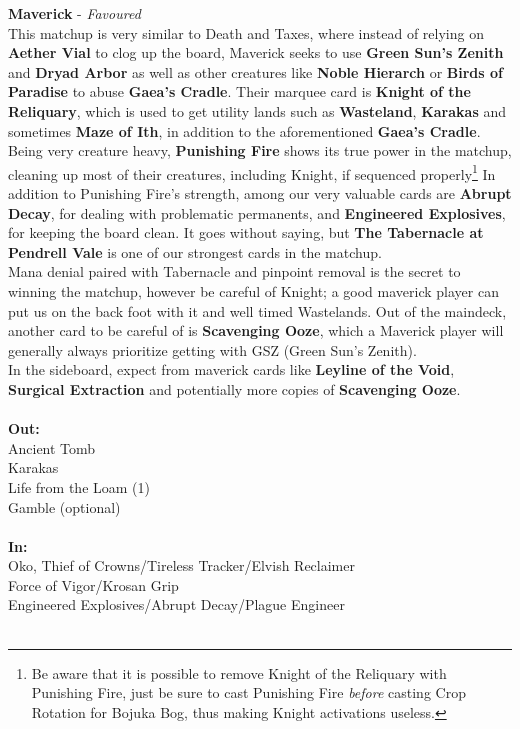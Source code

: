\documentclass{report}
\begin{document}
\textbf{Maverick} - \emph{Favoured}\\
This matchup is very similar to Death and Taxes, where instead of relying on \textbf{Aether Vial} to clog up the board, Maverick seeks to use \textbf{Green Sun's Zenith} and \textbf{Dryad Arbor} as well as other creatures like \textbf{Noble Hierarch} or \textbf{Birds of Paradise} to abuse \textbf{Gaea's Cradle}. Their marquee card is \textbf{Knight of the Reliquary}, which is used to get utility lands such as \textbf{Wasteland}, \textbf{Karakas} and sometimes \textbf{Maze of Ith}, in addition to the aforementioned \textbf{Gaea's Cradle}. Being very creature heavy, \textbf{Punishing Fire} shows its true power in the matchup, cleaning up most of their creatures, including Knight, if sequenced properly\footnote{Be aware that it is possible to remove Knight of the Reliquary with Punishing Fire, just be sure to cast Punishing Fire \emph{before} casting Crop Rotation for Bojuka Bog, thus making Knight activations useless.} In addition to Punishing Fire's strength, among our very valuable cards are \textbf{Abrupt Decay}, for dealing with problematic permanents, and \textbf{Engineered Explosives}, for keeping the board clean. It goes without saying, but \textbf{The Tabernacle at Pendrell Vale} is one of our strongest cards in the matchup.\\ Mana denial paired with Tabernacle and pinpoint removal is the secret to winning the matchup, however be careful of Knight; a good maverick player can put us on the back foot with it and well timed Wastelands. Out of the maindeck, another card to be careful of is \textbf{Scavenging Ooze}, which a Maverick player will generally always prioritize getting with GSZ (Green Sun's Zenith).\\ In the sideboard, expect from maverick cards like \textbf{Leyline of the Void}, \textbf{Surgical Extraction} and potentially more copies of \textbf{Scavenging Ooze}.\\\\
\textbf{Out:}\\
Ancient Tomb\\Karakas\\Life from the Loam (1)\\Gamble (optional)\\\\
\textbf{In:}\\
Oko, Thief of Crowns/Tireless Tracker/Elvish Reclaimer\\Force of Vigor/Krosan Grip\\Engineered Explosives/Abrupt Decay/Plague Engineer\\\\
\end{document}
